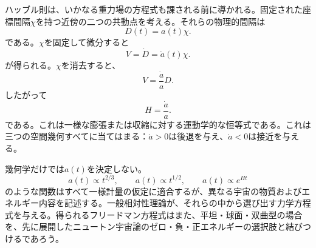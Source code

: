 ハッブル則は、いかなる重力場の方程式も課される前に導かれる。固定された座標間隔\(\chi\)を持つ近傍の二つの共動点を考える。それらの物理的間隔は
\begin{equation}
D(t)=a(t)\chi.
\label{eq:c03-comoving-distance}
\end{equation}
である。\(\chi\)を固定して微分すると
\begin{equation}
V=\dot D=\dot a(t)\chi.
\end{equation}
が得られる。\(\chi\)を消去すると、
\begin{equation}
V = \frac{\dot a}{a} D.
\label{eq:c03-hubble-law}
\end{equation}
したがって
\begin{equation}
H = \frac{\dot a}{a}.
\label{eq:c03-hubble-parameter}
\end{equation}
である。これは一様な膨張または収縮に対する運動学的な恒等式である。これは三つの空間幾何すべてに当てはまる：\(\dot a>0\)は後退を与え、\(\dot a<0\)は接近を与える。

幾何学だけでは\(a(t)\)を決定しない。
\begin{equation}
a(t)\propto t^{2/3},
\qquad
a(t)\propto t^{1/2},
\qquad
a(t)\propto e^{Ht}
\end{equation}
のような関数はすべて一様計量の仮定に適合するが、異なる宇宙の物質およびエネルギー内容を記述する。一般相対性理論が、それらの中から選び出す力学方程式を与える。得られるフリードマン方程式はまた、平坦・球面・双曲型の場合を、先に展開したニュートン宇宙論のゼロ・負・正エネルギーの選択肢と結びつけるであろう。

\begin{classroomqa}
\end{classroomqa}

\begin{classroomqa}
\end{classroomqa}


